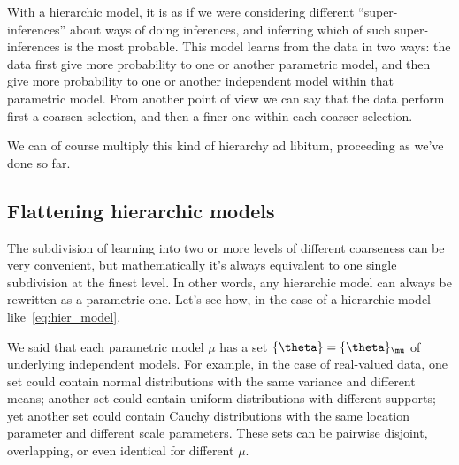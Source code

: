 \documentclass[\ifafour a4paper,12pt,\else a5paper,10pt,\fi%
onecolumn,oneside,article,%
british%
]{memoir}
\theoremstyle{remark}
\theoremstyle{innote}
\DeclarePairedDelimiter\set{\{}{\}}
\renewcommand*{\|}{\mathpunct{|}}
\newcommand*{\yth}{\theta}
\newcommand*{\ymu}{\mu}
\begin{document}
With a hierarchic model, it is as if we were considering different
\enquote{super-inferences} about ways of doing inferences, and inferring
which of such super-inferences is the most probable. This model learns from
the data in two ways: the data first give more probability to one or
another parametric model, and then give more probability to one or another
independent model within that parametric model. From another point of view
we can say that the data perform first a coarsen selection, and then a
finer one within each coarser selection.

We can of course multiply this kind of hierarchy ad libitum, proceeding as
we've done so far.

\subsection{Flattening hierarchic models}
\label{sec:flatten}

The subdivision of learning into two or more levels of different coarseness
can be very convenient, but mathematically it's always equivalent to one single
subdivision at the finest level. In other words, any hierarchic model can
always be rewritten as a parametric one. Let's see how, in the case of a
hierarchic model like~\eqref{eq:hier_model}.

We said that each parametric model $\ymu$ has a set
$\set{\yth} = \set{\yth}_{\ymu}$ of underlying independent models. For
example, in the case of real-valued data, one set could contain normal
distributions with the same variance and different means; another set could
contain uniform distributions with different supports; yet another set
could contain Cauchy distributions with the same location parameter and
different scale parameters. These sets can be pairwise disjoint,
overlapping, or even identical for different $\ymu$.
\end{document}
